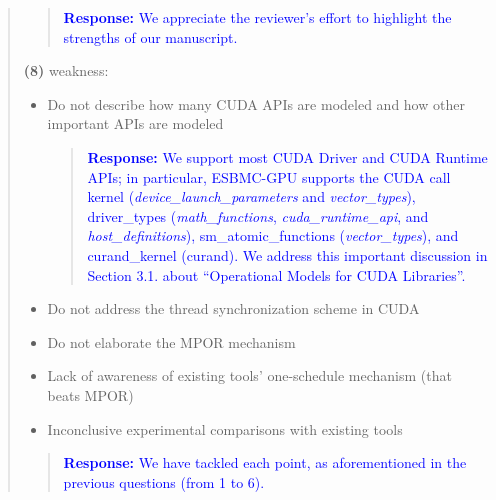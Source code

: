 \documentclass[11pt]{article}
\begin{document}
\begin{quote}
\begin{quote}
\textcolor{blue}{\textbf{Response:} We appreciate the reviewer's effort to highlight the strengths of our manuscript.}
\end{quote}

{\bf (8)} weakness:

\begin{itemize}
\item Do not describe how many CUDA APIs are modeled and how other important APIs are modeled

\begin{quote}
\textcolor{blue}{\textbf{Response:} We support most CUDA Driver and CUDA Runtime APIs; in particular, ESBMC-GPU supports the CUDA call kernel (\textit{device\_launch\_parameters} and \textit{vector\_types}), driver\_types (\textit{math\_functions}, \textit{cuda\_runtime\_api}, and \textit{host\_definitions}), sm\_atomic\_functions (\textit{vector\_types}), and curand\_kernel (curand). We address this important discussion in Section 3.1. about ``Operational Models for CUDA Libraries''.}
\end{quote}

\item Do not address the thread synchronization scheme in CUDA
\item Do not elaborate the MPOR mechanism
\item Lack of awareness of existing tools' one-schedule mechanism (that beats MPOR)
\item Inconclusive experimental comparisons with existing tools
\end{itemize}

\begin{quote}
\textcolor{blue}{\textbf{Response:} We have tackled each point, as aforementioned in the previous questions (from 1 to 6).}
\end{quote}

\end{quote}
		
	
\newpage
\end{document}
